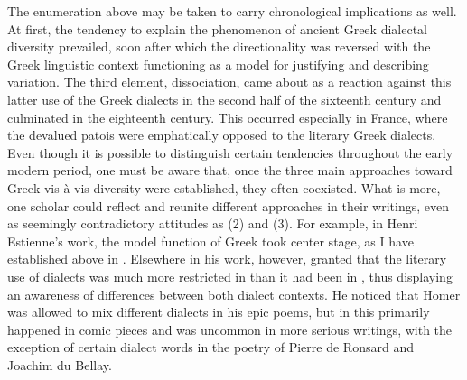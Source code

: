 The enumeration above may be taken to carry chronological implications as well. At first, the tendency to explain the phenomenon of ancient Greek dialectal diversity prevailed, soon after which the directionality was reversed with the Greek linguistic context functioning as a model for justifying and describing  variation. The third element, dissociation, came about as a reaction against this latter use of the Greek dialects in the second half of the sixteenth century and culminated in the eighteenth century. This occurred especially in France, where the devalued patois were emphatically opposed to the literary Greek dialects. Even though it is possible to distinguish certain tendencies throughout the early modern period, one must be aware that, once the three main approaches toward Greek vis-à-vis  diversity were established, they often coexisted. What is more, one scholar could reflect and reunite different approaches in their writings, even as seemingly contradictory attitudes as (2) and (3). For example, in Henri Estienne’s work, the model function of Greek took center stage, as I have established above in . Elsewhere in his work, however, \citet[93--94]{Estienne1587} granted that the literary use of dialects was much more restricted in  than it had been in , thus displaying an awareness of differences between both dialect contexts. He noticed that Homer was allowed to mix different dialects in his epic poems, but in  this primarily happened in comic pieces and was uncommon in more serious writings, with the exception of certain dialect words in the poetry of Pierre de Ronsard and Joachim du Bellay.


